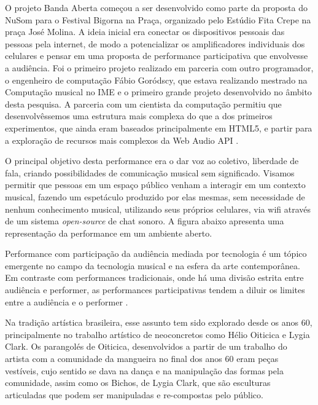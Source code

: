 O projeto Banda Aberta começou a ser desenvolvido como parte da proposta do NuSom para o Festival Bigorna na Praça, organizado pelo Estúdio Fita Crepe na praça José Molina. A ideia inicial era conectar os dispositivos pessoais das pessoas pela internet, de modo a potencializar os amplificadores individuais dos celulares e pensar em uma proposta de performance participativa que envolvesse a audiência. Foi o primeiro projeto realizado em parceria com outro programador, o engenheiro de computação Fábio Goródscy, que estava realizando mestrado na Computação musical no IME e o primeiro grande projeto desenvolvido no âmbito desta pesquisa. A parceria com um cientista da computação permitiu que desenvolvêssemos uma estrutura mais complexa do que a dos primeiros experimentos, que ainda eram baseados principalmente em HTML5, e partir para a exploração de recursos mais complexos da Web Audio API \cite{Adenot2015}.

O principal objetivo desta performance era o dar voz ao coletivo, liberdade de fala, criando possibilidades de comunicação musical sem significado. Visamos permitir que pessoas em um espaço público venham a interagir em um contexto musical, fazendo um espetáculo produzido por elas mesmas, sem necessidade de nenhum conhecimento musical, utilizando seus próprios celulares, via wifi através de um sistema \emph{open-source} de chat sonoro. A figura abaixo apresenta uma representação da performance em um ambiente aberto. 

Performance com participação da audiência mediada por tecnologia é um tópico emergente no campo da tecnologia musical \cite{wu2017open} e na esfera da arte contemporânea. Em contraste com performances tradicionais, onde há uma divisão estrita entre audiência e performer, as performances participativas tendem a diluir os limites entre a audiência e o performer \cite{kattwinkel2003audience}. 

Na tradição artística brasileira, esse assunto tem sido explorado desde os anos 60, principalmente no trabalho artístico de neoconcretos como Hélio Oiticica e Lygia Clark. Os parangolés de Oiticica, desenvolvidos a partir de um trabalho do artista com a comunidade da mangueira no final dos anos 60 eram peças vestíveis, cujo sentido se dava na dança e na manipulação das formas pela comunidade, assim como os Bichos, de Lygia Clark, que são esculturas articuladas que podem ser manipuladas e re-compostas pelo público. \cite{Braga2008}

